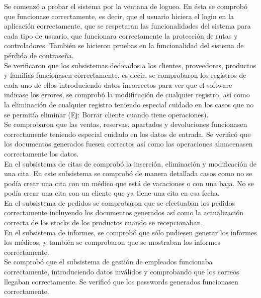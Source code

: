 Se comenzó a probar el sistema por la ventana de logueo. En ésta se comprobó que funcionase correctamente, es decir, que el usuario hiciera el login en la aplicación correctamente, que se respetaran las funcionalidades del sistema para cada tipo de usuario, que funcionara correctamente la protección de rutas y controladores. También se hicieron pruebas en la funcionalidad del sistema de pérdida de contraseña.\\

Se verificaron que los subsistemas dedicados a los clientes, proveedores, productos y familias funcionasen correctamente, es decir, se comprobaron los registros de cada uno de ellos introduciendo datos incorrectos para ver que el software indicase los errores, se comprobó la modificación de cualquier registro, así como la eliminación de cualquier registro teniendo especial cuidado en los casos que no se permitía eliminar (Ej: Borrar cliente cuando tiene operaciones).\\

Se comprobaron que las ventas, reservas, apartados y devoluciones funcionasen correctamente teniendo especial cuidado en los datos de entrada. Se verificó que los documentos generados fuesen correctos así como las operaciones almacenasen correctamente los datos.\\

En el subsistema de citas de comprobó la inserción, eliminación y modificación de una cita. En este subsistema se comprobó de manera detallada casos como no se podía crear una cita con un médico que está de vacaciones o con una baja. No se podía crear una cita con un cliente que ya tiene una cita en esa fecha.\\

En el subsistema de pedidos se comprobaron que se efectuaban los pedidos correctamente incluyendo los documentos generados así como la actualización correcta de los stocks de los productos cuando se recepcionaban.\\

En el subsistema de informes, se comprobó que sólo pudiesen generar los informes los médicos, y también se comprobaron que se mostraban los informes correctamente.\\

Se comprobó que el subsistema de gestión de empleados funcionaba correctamente, introduciendo datos inválidos y comprobando que los correos llegaban correctamente. Se verificó que los passwords generados funcionasen correctamente.\\

